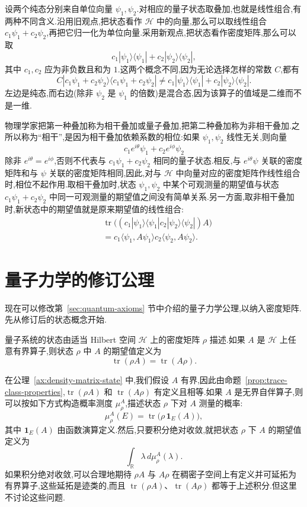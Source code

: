 设两个纯态分别来自单位向量 $\psi_1,\psi_2$.对相应的量子状态取叠加,也就是线性组合,有两种不同含义.沿用旧观点,把状态看作 $\mathcal H$ 中的向量,那么可以取线性组合 $c_1\psi_1+c_2\psi_2$,再把它归一化为单位向量.采用新观点,把状态看作密度矩阵,那么可以取
\[
 c_1|\psi_1\rangle\langle\psi_1|
 +c_2|\psi_2\rangle\langle\psi_2|,
\]
其中 $c_1,c_2$ 应为非负数且和为 $1$.这两个概念不同,因为无论选择怎样的常数 $C$,都有
\[
 C|c_1\psi_1+c_2\psi_2\rangle\langle c_1\psi_1+c_2\psi_2|
 \ne c_1|\psi_1\rangle\langle\psi_1|
 +c_2|\psi_2\rangle\langle\psi_2|.\label{eq:coherent-incoherent-superposition}
\]
左边是纯态,而右边(除非 $\psi_2$ 是 $\psi_1$ 的倍数)是混合态,因为该算子的值域是二维而不是一维.

物理学家把第一种叠加称为相干叠加或量子叠加,把第二种叠加称为非相干叠加.之所以称为“相干”,是因为相干叠加依赖系数的相位:如果 $\psi_1,\psi_2$ 线性无关,则向量
\[
 c_1e^{i\theta}\psi_1+c_2e^{i\phi}\psi_2
\]
除非 $e^{i\theta}=e^{i\phi}$,否则不代表与 $c_1\psi_1+c_2\psi_2$ 相同的量子状态.相反,与 $e^{i\theta}\psi$ 关联的密度矩阵和与 $\psi$ 关联的密度矩阵相同,因此,对与 $\mathcal H$ 中向量对应的密度矩阵作线性组合时,相位不起作用.取相干叠加时,状态 $\psi_1,\psi_2$ 中某个可观测量的期望值与状态 $c_1\psi_1+c_2\psi_2$ 中同一可观测量的期望值之间没有简单关系.另一方面,取非相干叠加时,新状态中的期望值就是原来期望值的线性组合:
\[
\begin{aligned}
 &\operatorname{tr}\bigl((c_1|\psi_1\rangle\langle\psi_1|
 c_2|\psi_2\rangle\langle\psi_2|)A\bigr)\\
 &=c_1\langle\psi_1,A\psi_1\rangle
 c_2\langle\psi_2,A\psi_2\rangle.
\end{aligned}
\]

\section{量子力学的修订公理}
\label{sec:modified-quantum-axioms}

现在可以修改第~\ref{sec:quantum-axioms} 节中介绍的量子力学公理,以纳入密度矩阵.先从修订后的状态概念开始.

\begin{axiom}[状态与期望值]\label{ax:density-matrix-state}
量子系统的状态由适当 Hilbert 空间 $\mathcal H$ 上的密度矩阵 $\rho$ 描述.如果 $A$ 是 $\mathcal H$ 上任意有界算子,则状态 $\rho$ 中 $A$ 的期望值定义为
\[
 \operatorname{tr}(\rho A)=\operatorname{tr}(A\rho).
\]
\end{axiom}

在公理~\ref{ax:density-matrix-state} 中,我们假设 $A$ 有界,因此由命题~\ref{prop:trace-class-properties},$\operatorname{tr}(\rho A)$ 和 $\operatorname{tr}(A\rho)$ 有定义且相等.如果 $A$ 是无界自伴算子,则可以按如下方式构造概率测度 $\mu_\rho^A$,描述状态 $\rho$ 下对 $A$ 测量的概率:
\[
 \mu_\rho^A(E)=\operatorname{tr}\bigl(\rho\,\mathbf1_E(A)\bigr),
\]
其中 $\mathbf1_E(A)$ 由函数演算定义.然后,只要积分绝对收敛,就把状态 $\rho$ 下 $A$ 的期望值定义为
\[
 \int_{\mathbb R}\lambda\,d\mu_\rho^A(\lambda).
\]
如果积分绝对收敛,可以合理地期待 $\rho A$ 与 $A\rho$ 在稠密子空间上有定义并可延拓为有界算子,这些延拓是迹类的,而且 $\operatorname{tr}(\rho A)$、$\operatorname{tr}(A\rho)$ 都等于上述积分.但这里不讨论这些问题.

